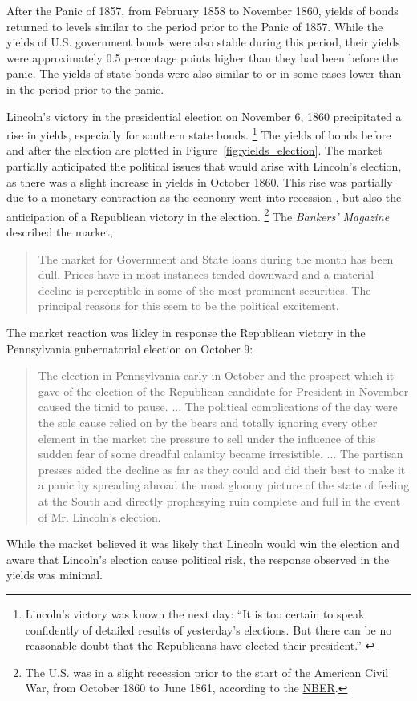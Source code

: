 \documentclass[11pt, oneside, article]{memoir}\usepackage[]{graphicx}\usepackage[]{color}
\begin{document}
After the Panic of 1857, from February 1858 to November 1860, yields of bonds returned to levels similar to the period prior to the Panic of 1857.
While the yields of U.S. government bonds were also stable during this period, their yields were approximately 0.5 percentage points higher than they had been before the panic.
The yields of state bonds were also similar to or in some cases lower than in the period prior to the panic.

Lincoln's victory in the presidential election on November 6, 1860 precipitated a rise in yields, especially for southern state bonds.%
\footnote{Lincoln's victory was known the next day: ``It is too certain to speak confidently of detailed results of yesterday's elections. But there can be no reasonable doubt that the Republicans have elected their president.'' \parencite{NYT1860}}
The yields of bonds before and after the election are plotted in Figure~\ref{fig:yields_election}.
The market partially anticipated the political issues that would arise with Lincoln's election, as there was a slight increase in yields in October 1860.
This rise was partially due to a monetary contraction as the economy went into recession \parencite[413]{BankersMagazine1861}, but also the anticipation of a Republican victory in the election.%
\footnote{The U.S. was in a slight recession prior to the start of the American Civil War, from October 1860 to June 1861, according to the  \href{http://www.nber.org/cycles/cyclesmain.html}{NBER}.}
The \textit{Bankers' Magazine} described the market,
\begin{quote}
   The market for Government and State loans during the month has been dull.
   Prices have in most instances tended downward and a material decline is perceptible in some of the most prominent securities.
   The principal reasons for this seem to be the political excitement.  \parencite[414]{BankersMagazine1861}
\end{quote}
The market reaction was likley in response the Republican victory in the Pennsylvania gubernatorial election on October 9:
\begin{quote}
  The election in Pennsylvania early in October and the prospect which it gave of the election of the Republican candidate for President in November caused the timid to pause. ...
  The political complications of the day were the sole cause relied on by the bears and totally ignoring every other element in the market the pressure to sell under the influence of this sudden fear of some dreadful calamity became irresistible. ...
  The partisan presses aided the decline as far as they could and did their best to make it a panic by spreading abroad the most gloomy picture of the state of feeling at the South and directly prophesying ruin complete and full in the event of Mr. Lincoln's election.
  \parencites[476-77]{BankersMagazine1861}
\end{quote}
While the market believed it was likely that Lincoln would win the election and aware that Lincoln's election cause political risk, the  response observed in the yields was minimal.
\end{document}
